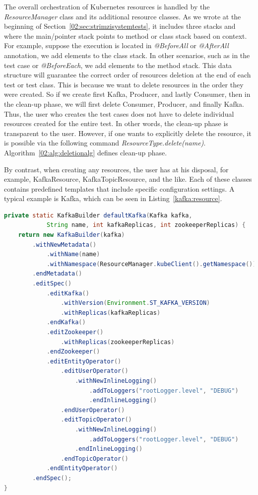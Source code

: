 The overall orchestration of Kubernetes resources is handled by the \emph{ResourceManager} class and its additional resource classes.
As we wrote at the beginning of Section~\ref{02:sec:strimzisystemtests}, it includes three stacks and where the main/pointer stack points to method or class stack based on context.
For example, suppose the execution is located in \emph{@BeforeAll} or \emph{@AfterAll} annotation, we add elements to the class stack.
In other scenarios, such as in the test case or \emph{@BeforeEach}, we add elements to the method stack.
This data structure will guarantee the correct order of resources deletion at the end of each test or test class.
This is because we want to delete resources in the order they were created.
So if we create first Kafka, Producer, and lastly Consumer, then in the clean-up phase, we will first delete Consumer, Producer, and finally Kafka.
Thus, the user who creates the test cases does not have to delete individual resources created for the entire test.
In other words, the clean-up phase is transparent to the user.
However, if one wants to explicitly delete the resource, it is possible via the following command \emph{ResourceType.delete(name)}.
Algorithm~\ref{02:alg:deletionalg} defines clean-up phase.


By contrast, when creating any resources, the user has at his disposal, for example, KafkaResource, KafkaTopicResource, and the like.
Each of these classes contains predefined templates that include specific configuration settings.
A typical example is Kafka, which can be seen in Listing~\ref{kafka:resource}.

\begin{lstlisting}[language=Java,label=kafka:resource,caption=Default Kafka Custom Resource in KafkaResource\.class,frame=tb]
private static KafkaBuilder defaultKafka(Kafka kafka,
            String name, int kafkaReplicas, int zookeeperReplicas) {
    return new KafkaBuilder(kafka)
        .withNewMetadata()
            .withName(name)
            .withNamespace(ResourceManager.kubeClient().getNamespace())
        .endMetadata()
        .editSpec()
            .editKafka()
                .withVersion(Environment.ST_KAFKA_VERSION)
                .withReplicas(kafkaReplicas)
            .endKafka()
            .editZookeeper()
                .withReplicas(zookeeperReplicas)
            .endZookeeper()
            .editEntityOperator()
                .editUserOperator()
                    .withNewInlineLogging()
                        .addToLoggers("rootLogger.level", "DEBUG")
                        .endInlineLogging()
                .endUserOperator()
                .editTopicOperator()
                    .withNewInlineLogging()
                        .addToLoggers("rootLogger.level", "DEBUG")
                    .endInlineLogging()
                .endTopicOperator()
            .endEntityOperator()
        .endSpec();
}
\end{lstlisting}

